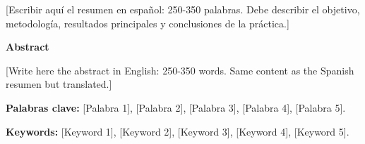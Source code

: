 \documentclass[12pt, a4paper]{article}
\begin{document}
\begin{center}
\begin{minipage}{0.95\textwidth}
        [Escribir aquí el resumen en español: 250-350 palabras. Debe describir el objetivo, metodología, resultados principales y conclusiones de la práctica.]
        
        \vspace{0.5cm}
        
        \textbf{Abstract}
        
        [Write here the abstract in English: 250-350 words. Same content as the Spanish resumen but translated.]
        
        \vspace{0.5cm}
        
        \textbf{Palabras clave:} [Palabra 1], [Palabra 2], [Palabra 3], [Palabra 4], [Palabra 5].
        
        \textbf{Keywords:} [Keyword 1], [Keyword 2], [Keyword 3], [Keyword 4], [Keyword 5].
    \end{minipage}
    
\end{center}

\newpage
\setcounter{page}{1}
\pagestyle{fancy}
\end{document}

